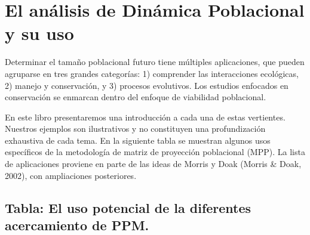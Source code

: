 \documentclass[
  12pt,
  letterpaper,
]{book}
\begin{document}
\chapter{El análisis de Dinámica Poblacional y su
uso}\label{el-anuxe1lisis-de-dinuxe1mica-poblacional-y-su-uso}

Determinar el tamaño poblacional futuro tiene múltiples aplicaciones,
que pueden agruparse en tres grandes categorías: 1) comprender las
interacciones ecológicas, 2) manejo y conservación, y 3) procesos
evolutivos. Los estudios enfocados en conservación se enmarcan dentro
del enfoque de viabilidad poblacional.

En este libro presentaremos una introducción a cada una de estas
vertientes. Nuestros ejemplos son ilustrativos y no constituyen una
profundización exhaustiva de cada tema. En la siguiente tabla se
muestran algunos usos específicos de la metodología de matriz de
proyección poblacional (MPP). La lista de aplicaciones proviene en parte
de las ideas de Morris y Doak (Morris \& Doak, 2002), con ampliaciones
posteriores.

\section{Tabla: El uso potencial de la diferentes acercamiento de
PPM.}\label{tabla-el-uso-potencial-de-la-diferentes-acercamiento-de-ppm.}
\end{document}

